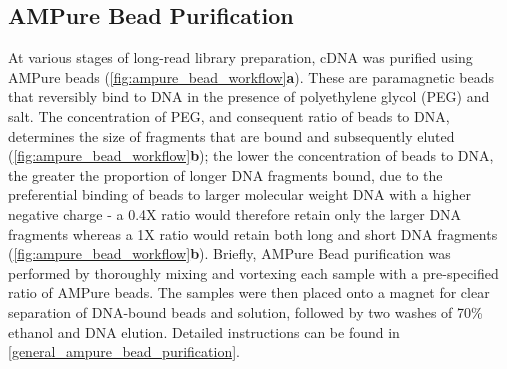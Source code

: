 \subsection{AMPure Bead Purification} 
\label{section:ch2_AMPure_explanation} 
At various stages of long-read library preparation, cDNA was purified using AMPure beads (\cref{fig:ampure_bead_workflow}\textbf{a}). These are paramagnetic beads that reversibly bind to DNA in the presence of polyethylene glycol (PEG) and salt. The concentration of PEG, and consequent ratio of beads to DNA, determines the size of fragments that are bound and subsequently eluted (\cref{fig:ampure_bead_workflow}\textbf{b}); the lower the concentration of beads to DNA, the greater the proportion of longer DNA fragments bound, due to the preferential binding of beads to larger molecular weight DNA with a higher negative charge - a 0.4X ratio would therefore retain only the larger DNA fragments whereas a 1X ratio would retain both long and short DNA fragments (\cref{fig:ampure_bead_workflow}\textbf{b}). Briefly, AMPure Bead purification was performed by thoroughly mixing and vortexing each sample with a pre-specified ratio of AMPure beads. The samples were then placed onto a magnet for clear separation of DNA-bound beads and solution, followed by two washes of 70\% ethanol and DNA elution. Detailed instructions can be found in \cref{general_ampure_bead_purification}.

